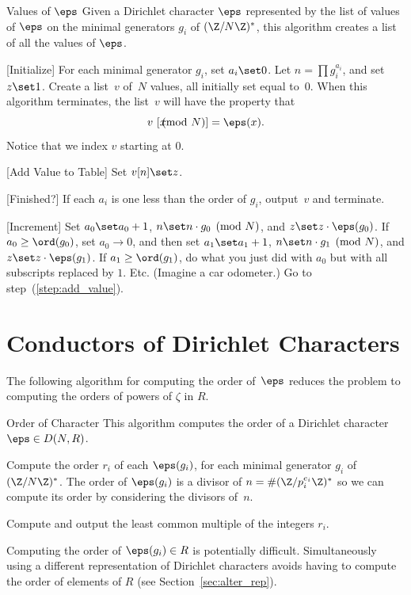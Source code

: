 \begin{algorithm}{Values of $\eps$}
Given a Dirichlet character $\eps$ represented by the list
of values of $\eps$ on the minimal generators $g_i$ of $(\Z/N\Z)^*$, this algorithm
creates a list of all the values of $\eps$.
\begin{steps}
\item{}[Initialize] For each minimal generator $g_i$, set $a_i\set 0$.
  Let $n = \prod g_i^{a_i}$, and set $z\set 1$.  Create a list~$v$
  of~$N$ values, all initially set equal to~$0$.  When this algorithm
  terminates, the list~$v$ will have the property that 
  $$v\,\,[x
  \!\!\!\!\!\pmod{N}] = \eps(x).$$
  Notice that we index $v$ starting
  at $0$.
\item{}[Add Value to Table]\label{step:add_value} Set $v[n] \set z$.
\item{}[Finished?] If each $a_i$ is one less than the order of $g_i$, output~$v$ 
and terminate.
\item{}[Increment] Set $a_0\set a_0 + 1$, $n\set n\cdot g_0\pmod{N}$,
and $z\set z\cdot \eps(g_0)$.  If $a_0\geq \ord(g_0)$, set $a_0\to 0$,
and then set $a_1\set a_1 + 1$, $n\set n\cdot g_1\pmod{N}$, and 
$z\set z\cdot \eps(g_1)$.  If $a_1\geq \ord(g_1)$, do what you just
did with $a_0$ but with all subscripts replaced by $1$.  Etc.
(Imagine a car odometer.)  Go to step~(\ref{step:add_value}).
\end{steps}
\end{algorithm}





\section{Conductors of Dirichlet Characters}\label{sec:conddir}

The following algorithm for computing the order of~$\eps$ reduces
the problem to computing the orders of powers of $\zeta$ in $R$.
\begin{algorithm}{Order of Character}\label{alg:dir_order}
  This algorithm computes the order of a Dirichlet
  character $\eps\in D(N,R)$.
\begin{steps}
\item Compute the order $r_i$ of each $\eps(g_i)$, for each minimal
  generator $g_i$ of $(\Z/N\Z)^*$.  The order of $\eps(g_i)$ is
  a divisor of $n=\#(\Z/p_i^{e_i}\Z)^*$ so we can compute its order by
  considering the divisors of~$n$.
\item Compute and output the least common multiple of the integers
  $r_i$.
\end{steps}
\end{algorithm}
\begin{remark}
  Computing the order of $\eps(g_i) \in R$ is potentially difficult.
  Simultaneously using a different representation of Dirichlet
  characters avoids having to compute the order of elements of $R$
  (see Section~\ref{sec:alter_rep}).
\end{remark}


